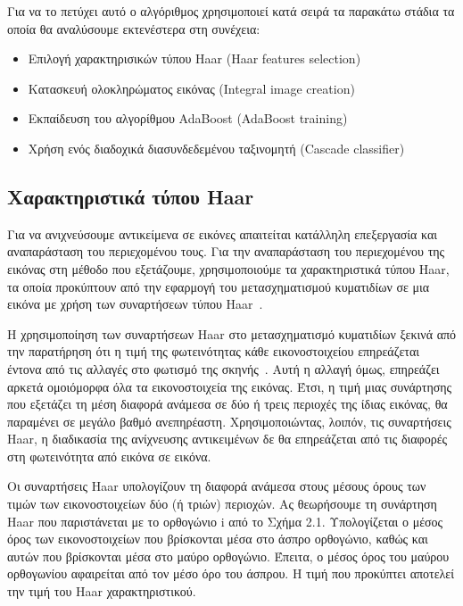 Για να το πετύχει αυτό ο αλγόριθμος χρησιμοποιεί κατά σειρά τα παρακάτω στάδια
τα οποία θα αναλύσουμε εκτενέστερα στη συνέχεια:
\begin{itemize}
 \item Επιλογή χαρακτηρισικών τύπου Haar (Haar features selection)
 \item Κατασκευή ολοκληρώματος εικόνας (Integral image creation)
 \item Εκπαίδευση του αλγορίθμου AdaBoost (AdaBoost training)
 \item Χρήση ενός διαδοχικά διασυνδεδεμένου ταξινομητή (Cascade classifier)
\end{itemize}

\subsection{Χαρακτηριστικά τύπου Haar}

Για να ανιχνεύσουμε αντικείμενα σε εικόνες απαιτείται κατάλληλη επεξεργασία και
αναπαράσταση του περιεχομένου τους. Για την αναπαράσταση του περιεχομένου της εικόνας στη
μέθοδο που εξετάζουμε, χρησιμοποιούμε τα χαρακτηριστικά τύπου Haar, τα οποία προκύπτουν
από την εφαρμογή του μετασχηματισμού κυματιδίων σε μια εικόνα με χρήση των συναρτήσεων
τύπου Haar~\cite{Viola01rapidobject}.

Η χρησιμοποίηση των συναρτήσεων Haar στο μετασχηματισμό κυματιδίων ξεκινά από την
παρατήρηση ότι η τιμή της φωτεινότητας κάθε εικονοστοιχείου επηρεάζεται έντονα από τις
        αλλαγές στο φωτισμό της σκηνής~\cite{OrePapSinOsu97}. Αυτή η αλλαγή όμως, επηρεάζει αρκετά ομοιόμορφα
όλα τα εικονοστοιχεία της εικόνας. Έτσι, η τιμή μιας συνάρτησης που εξετάζει τη μέση διαφορά
ανάμεσα σε δύο ή τρεις περιοχές της ίδιας εικόνας, θα παραμένει σε μεγάλο βαθμό ανεπηρέαστη.
Χρησιμοποιώντας, λοιπόν, τις συναρτήσεις Haar, η διαδικασία της ανίχνευσης αντικειμένων δε θα
επηρεάζεται από τις διαφορές στη φωτεινότητα από εικόνα σε εικόνα.

Οι συναρτήσεις Haar υπολογίζουν τη διαφορά ανάμεσα στους μέσους όρους των τιμών των
εικονοστοιχείων δύο (ή τριών) περιοχών. Ας θεωρήσουμε τη συνάρτηση Haar που παριστάνεται με
το ορθογώνιο i από το Σχήμα 2.1. Υπολογίζεται ο μέσος όρος των εικονοστοιχείων που
βρίσκονται μέσα στο άσπρο ορθογώνιο, καθώς και αυτών που βρίσκονται μέσα στο μαύρο
ορθογώνιο. Έπειτα, ο μέσος όρος του μαύρου ορθογωνίου αφαιρείται από τον μέσο όρο του
άσπρου. Η τιμή που προκύπτει αποτελεί την τιμή του Haar χαρακτηριστικού.

